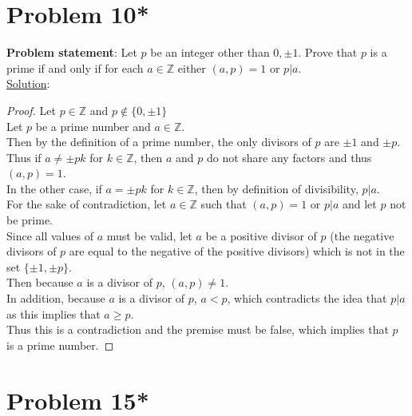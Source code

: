 \documentclass{article} %
\begin{document}
\newpage

\section*{Problem 10*}


\textbf{Problem statement}: Let $p$ be an integer other than $0, \pm 1$.  Prove that $p$ is a prime if and only if for each $a \in \mathbb{Z}$ either $(a,p) = 1$ or $p|a$.
\\

\underline{Solution}: 
\begin{addmargin}[1em]{0em}
\begin{proof}
Let $p \in \mathbb{Z}$ and $ p \notin \{0, \pm 1\}$
\\ \marginpar{$\Rightarrow$}
Let $p$ be a prime number and $a \in \mathbb{Z}$.
\\Then by the definition of a prime number, the only divisors of $p$ are $\pm 1$ and $\pm p$.
\\Thus if $a \neq \pm pk$ for $k \in \mathbb{Z}$, then $a$ and $p$ do not share any factors and thus $(a,p) = 1$.
\\In the other case, if $a = \pm pk$ for $k \in \mathbb{Z}$, then by definition of divisibility, $p|a$.
\\ \marginpar{$\Leftarrow$}
For the sake of contradiction, let $a \in \mathbb{Z}$ such that $(a,p) = 1$ or $p|a$ and let $p$ not be prime.
\\Since all values of $a$ must be valid, let $a$ be a positive divisor of $p$ (the negative divisors of $p$ are equal to the negative of the positive divisors) which is not in the set $\{\pm 1, \pm p\}$.
\\Then because $a$ is a divisor of $p$, $(a, p) \neq 1$.
\\In addition, because $a$ is a divisor of $p$, $a < p$, which contradicts the idea that $p|a$ as this implies that $a \geq p$.
\\Thus this is a contradiction and the premise must be false, which implies that $p$ is a prime number.
\end{proof}
\end{addmargin}

\newpage

\section*{Problem 15*}
\end{document}
